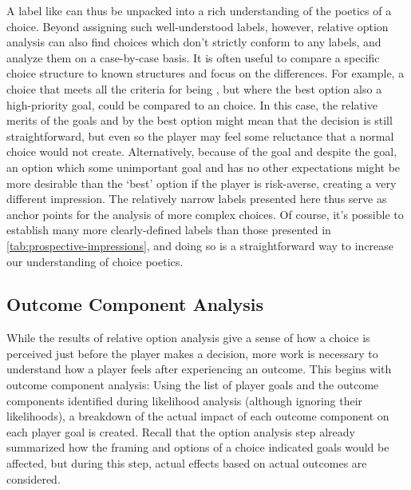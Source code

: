 A label like  can thus be unpacked into a rich understanding of the poetics of a choice.
%
Beyond assigning such well-understood labels, however, relative option analysis can also find choices which don't strictly conform to any labels, and analyze them on a case-by-case basis.
%
It is often useful to compare a specific choice structure to known structures and focus on the differences.
%
For example, a choice that meets all the criteria for being , but where the best option also  a high-priority goal, could be compared to an  choice.
%
In this case, the relative merits of the goals  and  by the best option might mean that the decision is still straightforward, but even so the player may feel some reluctance that a normal  choice would not create.
%
Alternatively, because of the  goal and despite the  goal, an option which  some unimportant goal and has no other expectations might be more desirable than the `best' option if the player is risk-averse, creating a very different impression.
%
The relatively narrow labels presented here thus serve as anchor points for the analysis of more complex choices.
%
Of course, it's possible to establish many more clearly-defined labels than those presented in \cref{tab:prospective-impressions}, and doing so is a straightforward way to increase our understanding of choice poetics.


\subsection{Outcome Component Analysis}

\label{sec:cp-outcome-component-analysis}

While the results of relative option analysis give a sense of how a choice is perceived just before the player makes a decision, more work is necessary to understand how a player feels after experiencing an outcome.
%
This begins with outcome component analysis: Using the list of player goals and the outcome components identified during likelihood analysis (although ignoring their likelihoods), a breakdown of the actual impact of each outcome component on each player goal is created.
%
Recall that the option analysis step already summarized how the framing and options of a choice indicated goals would be affected, but during this step, actual effects based on actual outcomes are considered.


